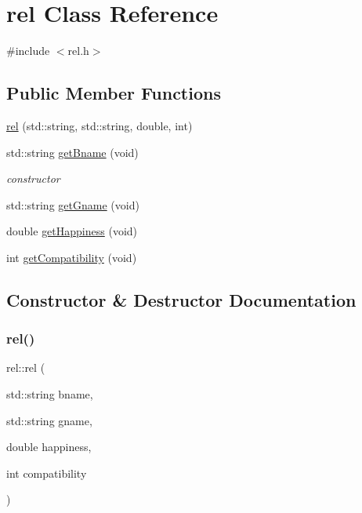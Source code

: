 \hypertarget{classrel}{}\section{rel Class Reference}
\label{classrel}


{\ttfamily \#include $<$rel.\+h$>$}

\subsection*{Public Member Functions}
\begin{DoxyCompactItemize}
\item 
\hyperlink{classrel_a8f18236fd22ac8c3bd4455315c2acd89}{rel} (std\+::string, std\+::string, double, int)
\item 
std\+::string \hyperlink{classrel_a1bb74d090c50469946d0eb1ccd9ab520}{get\+Bname} (void)
\begin{DoxyCompactList}\small\item\em constructor \end{DoxyCompactList}\item 
std\+::string \hyperlink{classrel_a250562cd452083afa84a0d5e02d7c1a6}{get\+Gname} (void)
\item 
double \hyperlink{classrel_af5bb5fbc139defc9433ace4f829124b0}{get\+Happiness} (void)
\item 
int \hyperlink{classrel_aebf12c2915c3231f23e4559b99c47a73}{get\+Compatibility} (void)
\end{DoxyCompactItemize}


\subsection{Constructor \& Destructor Documentation}
\mbox{\label{classrel_a8f18236fd22ac8c3bd4455315c2acd89}} 
\subsubsection{\texorpdfstring{rel()}{rel()}}
{\footnotesize\ttfamily rel\+::rel (\begin{DoxyParamCaption}\item[{std\+::string}]{bname,  }\item[{std\+::string}]{gname,  }\item[{double}]{happiness,  }\item[{int}]{compatibility }\end{DoxyParamCaption})}

